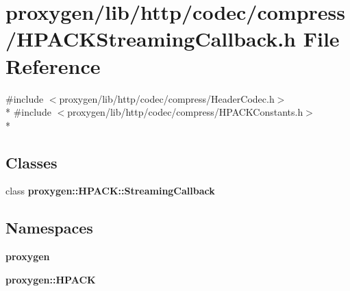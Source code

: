 \section{proxygen/lib/http/codec/compress/\+H\+P\+A\+C\+K\+Streaming\+Callback.h File Reference}
\label{HPACKStreamingCallback_8h}
{\ttfamily \#include $<$proxygen/lib/http/codec/compress/\+Header\+Codec.\+h$>$}\\*
{\ttfamily \#include $<$proxygen/lib/http/codec/compress/\+H\+P\+A\+C\+K\+Constants.\+h$>$}\\*
\subsection*{Classes}
\begin{DoxyCompactItemize}
\item 
class {\bf proxygen\+::\+H\+P\+A\+C\+K\+::\+Streaming\+Callback}
\end{DoxyCompactItemize}
\subsection*{Namespaces}
\begin{DoxyCompactItemize}
\item 
 {\bf proxygen}
\item 
 {\bf proxygen\+::\+H\+P\+A\+CK}
\end{DoxyCompactItemize}
